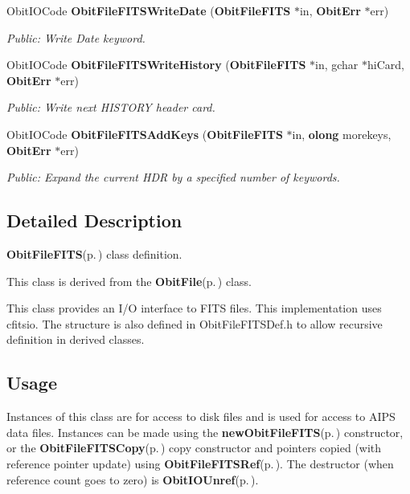 \begin{CompactItemize}
Obit\-IOCode {\bf Obit\-File\-FITSWrite\-Date} ({\bf Obit\-File\-FITS} $\ast$in, {\bf Obit\-Err} $\ast$err)
\begin{CompactList}\small\item\em Public: Write Date keyword. \item\end{CompactList}\item 
Obit\-IOCode {\bf Obit\-File\-FITSWrite\-History} ({\bf Obit\-File\-FITS} $\ast$in, gchar $\ast$hi\-Card, {\bf Obit\-Err} $\ast$err)
\begin{CompactList}\small\item\em Public: Write next HISTORY header card. \item\end{CompactList}\item 
Obit\-IOCode {\bf Obit\-File\-FITSAdd\-Keys} ({\bf Obit\-File\-FITS} $\ast$in, {\bf olong} morekeys, {\bf Obit\-Err} $\ast$err)
\begin{CompactList}\small\item\em Public: Expand the current HDR by a specified number of keywords. \item\end{CompactList}\end{CompactItemize}


\subsection{Detailed Description}
{\bf Obit\-File\-FITS}{\rm (p.\,\pageref{structObitFileFITS})} class definition. 

This class is derived from the {\bf Obit\-File}{\rm (p.\,\pageref{structObitFile})} class.

This class provides an I/O interface to FITS files. This implementation uses cfitsio. The structure is also defined in Obit\-File\-FITSDef.h to allow recursive definition in derived classes.\subsection{Usage}\label{ObitFileFITS_8h_ObitFileFITSUsage}
Instances of this class are for access to disk files and is used for access to AIPS data files. Instances can be made using the {\bf new\-Obit\-File\-FITS}{\rm (p.\,\pageref{ObitFileFITS_8c_a7})} constructor, or the {\bf Obit\-File\-FITSCopy}{\rm (p.\,\pageref{ObitFileFITS_8c_a9})} copy constructor and pointers copied (with reference pointer update) using {\bf Obit\-File\-FITSRef}{\rm (p.\,\pageref{ObitFileFITS_8h_a1})}. The destructor (when reference count goes to zero) is {\bf Obit\-IOUnref}{\rm (p.\,\pageref{ObitIO_8h_a0})}.

